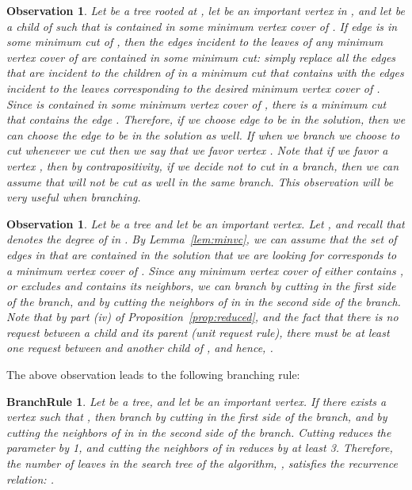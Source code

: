 \documentclass[11pt]{article}
\newtheorem{observation}[theorem]{Observation}
\newtheorem{branchrule}[theorem]{BranchRule}
\begin{document}
\begin{observation}\rm  Let  be a tree rooted at , let  be an important vertex in , and let  be a child of  such that  is contained in some minimum vertex cover of . If edge  is in some minimum cut of , then the edges incident to the leaves of any minimum vertex cover of  are contained in some minimum cut: simply replace all the edges that are incident to the children of  in a minimum cut that contains  with the edges incident to the leaves corresponding to the desired minimum vertex cover of . Since  is contained in some minimum vertex cover of , there is a minimum cut that contains the edge . Therefore, if we choose edge  to be in the solution, then we can choose the edge  to be in the solution as well. If when we branch we choose to cut  whenever we cut  then we say that we {\em favor} vertex . Note that if we favor a vertex , then by contrapositivity, if we decide not to cut  in a branch, then we can assume that  will not be cut as well in the same branch. This observation will be very useful when branching.
\end{observation}

\begin{observation}\rm
Let  be a tree and let  be an important vertex. Let , and recall that  denotes the degree of  in . By Lemma~\ref{lem:minvc}, we can assume that the set of edges in  that are contained in the solution that we are looking for corresponds to a minimum vertex cover of . Since any minimum vertex cover of  either contains , or excludes  and contains its neighbors, we can branch by cutting  in the first side of the branch, and by cutting the neighbors of  in  in the second side of the branch. Note that by part (iv) of Proposition~\ref{prop:reduced}, and the fact that there is no request between a child and its parent (unit request rule), there must be at least one request between  and another child of , and hence, . \\
\end{observation}

The above observation leads to the following branching rule:

\begin{branchrule}\label{branch:1}
Let  be a tree, and let  be an important vertex. If there exists a vertex  such that , then branch by cutting  in the first side of the branch, and by cutting the neighbors of  in  in the second side of the branch. Cutting  reduces the parameter  by 1, and cutting the neighbors of  in  reduces  by at least 3. Therefore, the number of leaves in the search tree of the algorithm, , satisfies the recurrence relation: .
\end{branchrule}
\end{document}
